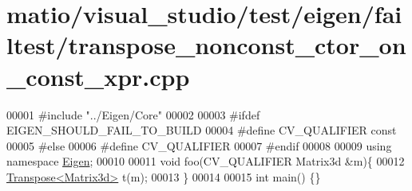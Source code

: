 \hypertarget{matio_2visual__studio_2test_2eigen_2failtest_2transpose__nonconst__ctor__on__const__xpr_8cpp_source}{}\section{matio/visual\+\_\+studio/test/eigen/failtest/transpose\+\_\+nonconst\+\_\+ctor\+\_\+on\+\_\+const\+\_\+xpr.cpp}
\label{matio_2visual__studio_2test_2eigen_2failtest_2transpose__nonconst__ctor__on__const__xpr_8cpp_source}

\begin{DoxyCode}
00001 \textcolor{preprocessor}{#include "../Eigen/Core"}
00002 
00003 \textcolor{preprocessor}{#ifdef EIGEN\_SHOULD\_FAIL\_TO\_BUILD}
00004 \textcolor{preprocessor}{#define CV\_QUALIFIER const}
00005 \textcolor{preprocessor}{#else}
00006 \textcolor{preprocessor}{#define CV\_QUALIFIER}
00007 \textcolor{preprocessor}{#endif}
00008 
00009 \textcolor{keyword}{using namespace }\hyperlink{namespace_eigen}{Eigen};
00010 
00011 \textcolor{keywordtype}{void} foo(CV\_QUALIFIER Matrix3d &m)\{
00012     \hyperlink{group___core___module_class_eigen_1_1_transpose}{Transpose<Matrix3d>} t(m);
00013 \}
00014 
00015 \textcolor{keywordtype}{int} main() \{\}
\end{DoxyCode}
